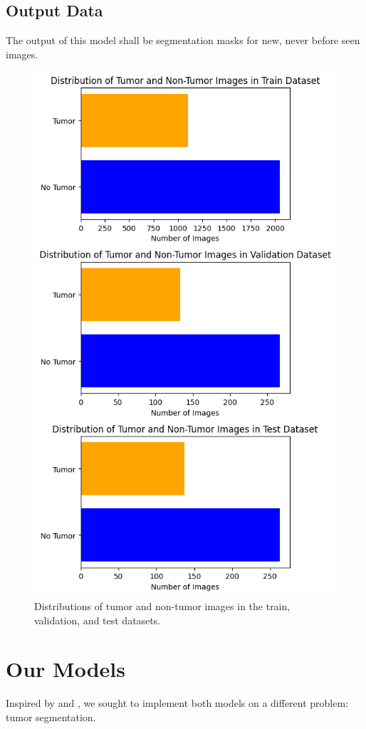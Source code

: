 \documentclass[conference]{IEEEtran}
\begin{document}
\subsection{Output Data}\label{sec3}
The output of this model shall be segmentation masks for new, never before seen images.
\begin{figure}[h!]
    \centering
    \includegraphics[width=0.75\columnwidth]{imgs/data_stats.png}
    \caption{Distributions of tumor and non-tumor images in the train, validation, and test datasets.}
    \label{fig:datastats}
\end{figure}


\section{Our Models}

Inspired by \cite{U-Mamba} and \cite{ultralightvmunet}, we sought to implement both models on a different problem: tumor segmentation.
\end{document}
